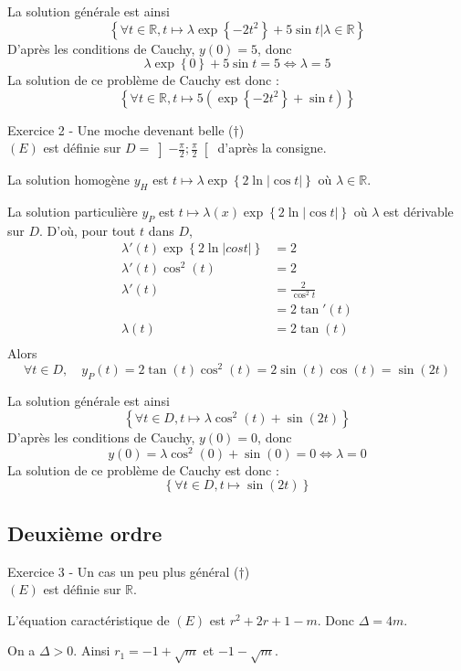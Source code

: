 \documentclass[a4paper, titlepage]{article}
\newenvironment{lititle}%
{\vspace{7mm}\LobsterTwo \large}%
{\\}
\begin{document}
	La solution générale est ainsi
	$$ \left\{\forall t\in\mathbb{R}, t\longmapsto \lambda\exp\left\{ -2t^2 \right\} + 5\sin t|\lambda\in\mathbb{R}\right\}$$
	D'après les conditions de Cauchy, $y(0) = 5$, donc
	$$ \lambda\exp\left\{ 0 \right\} + 5\sin t = 5 \iff \lambda = 5 $$
	La solution de ce problème de Cauchy est donc :
	$$ \left\{ \forall t\in\mathbb{R}, t\longmapsto 5\left( \exp\left\{ -2t^2 \right\} + \sin t \right)  \right\}  $$

	\begin{lititle}
		Exercice 2 - Une moche devenant belle ($\dagger$)
	\end{lititle}
	$(E)$ est définie sur $D=\left] -\frac{\pi}{2};\frac{\pi}{2} \right[ $ d'après la consigne.

	La solution homogène $y_H$ est $t\longmapsto \lambda\exp\left\{ 2\ln|\cos t| \right\}$ où $\lambda\in\mathbb{R}$.

	La solution particulière $y_P$ est $t\longmapsto \lambda(x)\exp\left\{ 2\ln|\cos t| \right\}$ où $\lambda$ est dérivable sur $D$. D'où, pour tout $t$ dans $D$,
	\begin{align*}
		\lambda'(t)\exp\left\{ 2\ln|cos t| \right\} &= 2 \\
		\lambda'(t)\cos^2(t) &= 2 \\
		\lambda'(t) &= \frac{2}{\cos^2 t} \\
		&= 2\tan'(t) \\
		\lambda(t) &= 2\tan(t) \\
	\end{align*}
	Alors
	$$ \forall t\in D,\quad y_P(t) = 2\tan(t)\cos^2(t) = 2\sin(t)\cos(t) = \sin(2t) $$

	La solution générale est ainsi
	$$ \left\{ \forall t\in D,t\longmapsto \lambda\cos^2(t) + \sin(2t) \right\} $$
	D'après les conditions de Cauchy, $y(0) = 0$, donc
	$$ y(0) = \lambda\cos^2(0) + \sin(0) = 0 \iff \lambda = 0 $$
	La solution de ce problème de Cauchy est donc :
	$$ \left\{ \forall t\in D,t\longmapsto \sin(2t) \right\}  $$
	\subsection{Deuxième ordre}
	\begin{lititle}
		Exercice 3 - Un cas un peu plus général ($\dagger$)
	\end{lititle}
	$(E)$ est définie sur $\mathbb{R}$.

	L'équation caractéristique de $(E)$ est $r^2+2r+1-m$. Donc $\Delta = 4m$.

	 On a $\Delta > 0$. Ainsi $r_1 = -1+\sqrt m$ et $-1-\sqrt m$.
\end{document}
